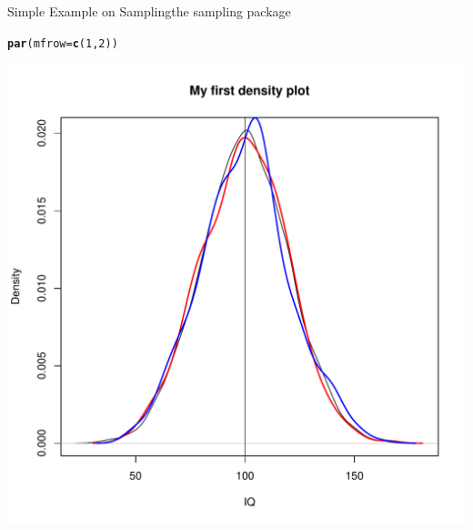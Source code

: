 \documentclass[11pt,german,hideothersubsections]{beamer}\usepackage[]{graphicx}\usepackage[]{color}
\makeatletter
\def\maxwidth{ %
  \ifdim\Gin@nat@width>\linewidth
    \linewidth
  \else
    \Gin@nat@width
  \fi
}
\newcommand{\hlnum}[1]{\textcolor[rgb]{0.686,0.059,0.569}{#1}}%
\newcommand{\hlstd}[1]{\textcolor[rgb]{0.345,0.345,0.345}{#1}}%
\newcommand{\hlkwc}[1]{\textcolor[rgb]{0.333,0.667,0.333}{#1}}%
\newcommand{\hlkwd}[1]{\textcolor[rgb]{0.737,0.353,0.396}{\textbf{#1}}}%
\newenvironment{kframe}{%
 \def\at@end@of@kframe{}%
 \ifinner\ifhmode%
  \def\at@end@of@kframe{\end{minipage}}%
  \begin{minipage}{\columnwidth}%
 \fi\fi%
 \def\FrameCommand##1{\hskip\@totalleftmargin \hskip-\fboxsep
 \colorbox{shadecolor}{##1}\hskip-\fboxsep
     \hskip-\linewidth \hskip-\@totalleftmargin \hskip\columnwidth}%
 \MakeFramed {\advance\hsize-\width
   \@totalleftmargin\z@ \linewidth\hsize
   \@setminipage}}%
 {\par\unskip\endMakeFramed%
 \at@end@of@kframe}
\newenvironment{knitrout}{}{} %
\makeatother
\begin{document}
\begin{frame}[fragile]{Simple Example on Sampling}{the sampling package}
\begin{knitrout}
\color{fgcolor}\begin{kframe}
\begin{alltt}
\hlkwd{par}\hlstd{(}\hlkwc{mfrow} \hlstd{=} \hlkwd{c}\hlstd{(}\hlnum{1}\hlstd{,} \hlnum{2}\hlstd{))}
\end{alltt}
\end{kframe}
\end{knitrout}
\begin{minipage}{5.5cm}
\begin{knitrout}
\color{fgcolor}
\includegraphics[width=\maxwidth]{figure/unnamed-chunk-17-1} 

\end{knitrout}
\end{minipage}
\end{frame}
\end{document}
